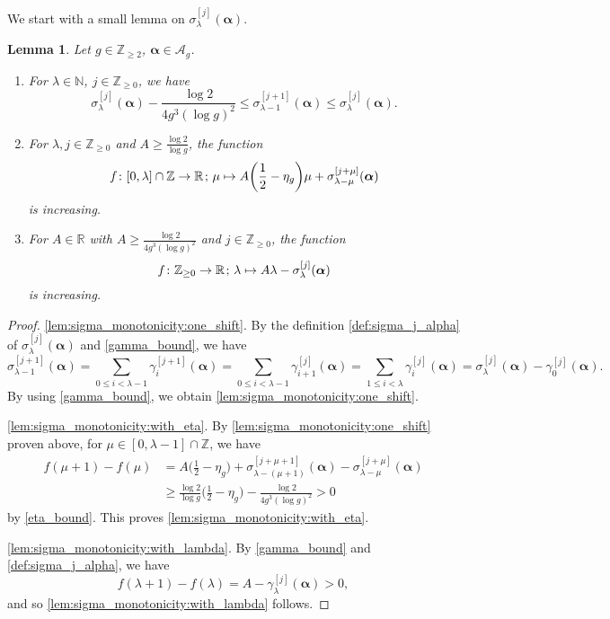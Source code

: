 \documentclass[hidelinks]{amsart}
\numberwithin{equation}{section}
\theoremstyle{plain}
\newtheorem{lemma}{Lemma}
\theoremstyle{definition}
\newcommand{\proofitem}[1]{\noindent\cref{#1}.}
\newcommand{\semicolon}{\nobreak\mskip2mu\mathpunct{}\nonscript
\mkern-\thinmuskip{;}\mskip6muplus1mu\relax}
\begin{document}
We start with a small lemma on $\sigma_{\lambda}^{[j]}(\bm{\alpha})$.
\begin{lemma}
\label{lem:sigma_monotonicity}
Let $g\in\mathbb{Z}_{\ge2}$, $\bm{\alpha}\in\mathscr{A}_{g}$.
\begin{enumerate}[]
\item\label{lem:sigma_monotonicity:one_shift}
For $\lambda\in\mathbb{N}$, $j\in\mathbb{Z}_{\ge0}$, we have
\[
\sigma_{\lambda}^{[j]}(\bm{\alpha})-\frac{\log 2}{4g^{3}(\log g)^{2}}
\le
\sigma_{\lambda-1}^{[j+1]}(\bm{\alpha})
\le
\sigma_{\lambda}^{[j]}(\bm{\alpha}).
\]
\item\label{lem:sigma_monotonicity:with_eta}
For $\lambda,j\in\mathbb{Z}_{\ge0}$ and $A\ge\frac{\log 2}{\log g}$, the function
\[
f\colon
[0,\lambda]\cap\mathbb{Z}
\to
\mathbb{R}
\semicolon
\mu
\mapsto
A\biggl(\frac{1}{2}-\eta_{g}\biggr)\mu+\sigma_{\lambda-\mu}^{[j+\mu]}(\bm{\alpha})
\]
is increasing.
\item\label{lem:sigma_monotonicity:with_lambda}
For $A\in\mathbb{R}$ with $A\ge\frac{\log 2}{4g^{3}(\log g)^{2}}$ and $j\in\mathbb{Z}_{\ge0}$, the function
\[
f\colon
\mathbb{Z}_{\ge0}
\to
\mathbb{R}
\semicolon
\lambda\mapsto A\lambda-\sigma_{\lambda}^{[j]}(\bm{\alpha})
\]
is increasing.
\end{enumerate}
\end{lemma}
\begin{proof}
\leavevmode\par\medskip

\proofitem{lem:sigma_monotonicity:one_shift}
By the definition \cref{def:sigma_j_alpha} of $\sigma_{\lambda}^{[j]}(\bm{\alpha})$
and \cref{gamma_bound}, we have
\[
\sigma_{\lambda-1}^{[j+1]}(\bm{\alpha})
=
\sum_{0\le i<\lambda-1}
\gamma_{i}^{[j+1]}(\bm{\alpha})
=
\sum_{0\le i<\lambda-1}
\gamma_{i+1}^{[j]}(\bm{\alpha})
=
\sum_{1\le i<\lambda}
\gamma_{i}^{[j]}(\bm{\alpha})
=
\sigma_{\lambda}^{[j]}(\bm{\alpha})
-
\gamma_{0}^{[j]}(\bm{\alpha}).
\]
By using \cref{gamma_bound}, we obtain \cref{lem:sigma_monotonicity:one_shift}.
\medskip

\proofitem{lem:sigma_monotonicity:with_eta}
By \cref{lem:sigma_monotonicity:one_shift} proven above,
for $\mu\in[0,\lambda-1]\cap\mathbb{Z}$, we have
\begin{align}
\label{lem:sigma_monotonicity:with_eta:diff}
f(\mu+1)-f(\mu)
&=
A\biggl(\frac{1}{2}-\eta_{g}\biggr)
+
\sigma_{\lambda-(\mu+1)}^{[j+\mu+1]}(\bm{\alpha})
-
\sigma_{\lambda-\mu}^{[j+\mu]}(\bm{\alpha})\\
&\ge
\frac{\log 2}{\log g}\biggl(\frac{1}{2}-\eta_{g}\biggr)
-
\frac{\log 2}{4g^{3}(\log g)^{2}}
>0
\end{align}
by \cref{eta_bound}.
This proves \cref{lem:sigma_monotonicity:with_eta}.
\medskip

\proofitem{lem:sigma_monotonicity:with_lambda}
By \cref{gamma_bound} and \cref{def:sigma_j_alpha}, we have
\[
f(\lambda+1)-f(\lambda)
=
A-\gamma_{\lambda}^{[j]}(\bm{\alpha})
>0,
\]
and so \cref{lem:sigma_monotonicity:with_lambda} follows.
\end{proof}
\end{document}
